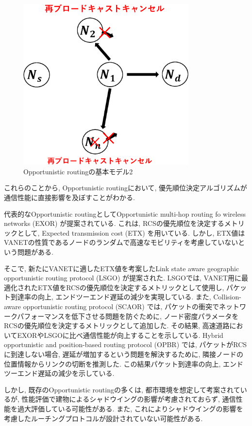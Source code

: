 \documentclass[10pt]{jreport}
\begin{document}
\begin{figure}[!ht]
	\centering
	\includegraphics[width=90mm]{figures/basic-opportunity2.eps}
	\caption{Opportunistic routingの基本モデル2}
	\label{fig:Basic2}
\end{figure}

これらのことから, Opportunistic routingにおいて, 優先順位決定アルゴリズムが通信性能に直接影響を及ぼすことがわかる.

代表的なOpportunistic routingとしてOpportunistic multi-hop routing fo wireless networks (EXOR) \cite{16}が提案されている. これは, RCSの優先順位を決定するメトリックとして, Expected transmission cost (ETX) \cite{21}を用いている. しかし, ETX値はVANETの性質であるノードのランダムで高速なモビリティを考慮していないという問題がある.

そこで, 新たにVANETに適したETX値を考案したLink state aware geographic opportunistic routing protocol (LSGO) \cite{18}が提案された. LSGOでは, VANET用に最適化されたETX値をRCSの優先順位を決定するメトリックとして使用し, パケット到達率の向上, エンドツーエンド遅延の減少を実現している. また, Collision-aware opportunistic routing protocol (SCAOR) \cite{22}では, パケットの衝突でネットワークパフォーマンスを低下させる問題を防ぐために, ノード密度パラメータをRCSの優先順位を決定するメトリックとして追加した. その結果, 高速道路においてEXORやLSGOに比べ通信性能が向上することを示している. Hybrid opportunistic and position-based routing  protocol (OPBR) \cite{23}では, パケットがRCSに到達しない場合, 遅延が増加するという問題を解決するために, 隣接ノードの位置情報からリンクの切断を推測した. この結果パケット到達率の向上, エンドツーエンド遅延の減少を示している.

しかし, 既存のOpportunistic routingの多くは, 都市環境を想定して考案されているが, 性能評価で建物によるシャドウイングの影響が考慮されておらず, 通信性能を過大評価している可能性がある. また, これによりシャドウイングの影響を考慮したルーチングプロトコルが設計されていない可能性がある. 
\end{document}
